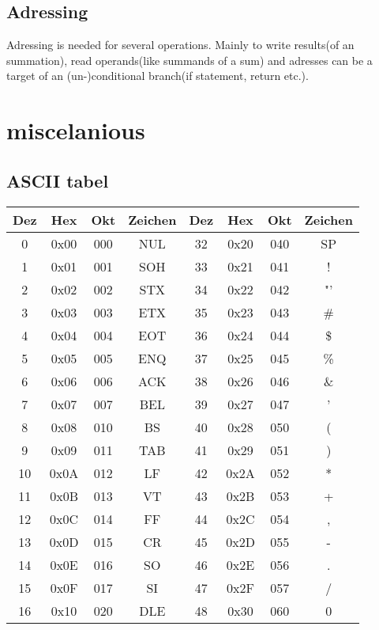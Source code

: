 \documentclass[a4paper]{scrartcl}
\begin{document}
        \subsection{Adressing}
        Adressing is needed for several operations. Mainly to write results(of an summation), read operands(like summands of a sum) and adresses can be a target of an 
        (un-)conditional branch(if statement, return etc.).  
    \section{miscelanious}
    \subsection{ASCII tabel}
        \begin{longtable}{|c|c|c|c||c|c|c|c|}
        \hline
        Dez & Hex & Okt & Zeichen & Dez & Hex & Okt & Zeichen\\
        \hline
        0 & 0x00 & 000 & NUL & 32 & 0x20 & 040 & SP\\
        1 & 0x01 & 001 & SOH & 33 & 0x21 & 041 & ! \\
        2 & 0x02 & 002 & STX & 34 & 0x22 & 042 & "'\\
        3 & 0x03 & 003 & ETX & 35 & 0x23 & 043 & \# \\
        4 & 0x04 & 004 & EOT & 36 & 0x24 & 044 & \$ \\
        5 & 0x05 & 005 & ENQ & 37 & 0x25 & 045 & \% \\
        6 & 0x06 & 006 & ACK & 38 & 0x26 & 046 & \& \\
        7 & 0x07 & 007 & BEL & 39 & 0x27 & 047 & ' \\
        8 & 0x08 & 010 & BS & 40 & 0x28 & 050 & (  \\
        9 & 0x09 & 011 & TAB & 41 & 0x29 & 051 &  ) \\
        10 & 0x0A & 012 & LF & 42 & 0x2A & 052 & * \\
        11 & 0x0B & 013 & VT & 43 & 0x2B & 053 & + \\
        12 & 0x0C & 014 & FF & 44 & 0x2C & 054 & , \\
        13 & 0x0D & 015 & CR & 45 & 0x2D & 055 & - \\
        14 & 0x0E & 016 & SO & 46 & 0x2E & 056 & . \\
        15 & 0x0F & 017 & SI & 47 & 0x2F & 057 & / \\
        16 & 0x10 & 020 & DLE & 48 & 0x30 & 060 & 0 \\

\end{longtable}
\end{document}
